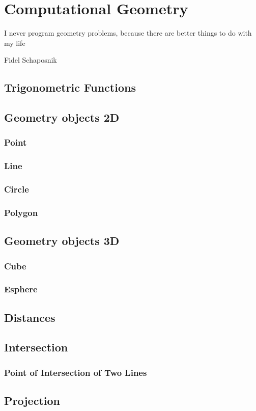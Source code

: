 \chapter{Computational Geometry}
  \epigraph{I never program geometry problems, because there are better things to do with my life}{Fidel Schaposnik}
	\section{Trigonometric Functions}
	\section{Geometry objects 2D}
		\subsection{Point}
		\subsection{Line}
		\subsection{Circle}
		\subsection{Polygon}
	\section{Geometry objects 3D}
		\subsection{Cube}
		\subsection{Esphere}
	\section{Distances}
	\section{Intersection}
		\subsection{Point of Intersection of Two Lines}
	\section{Projection}

